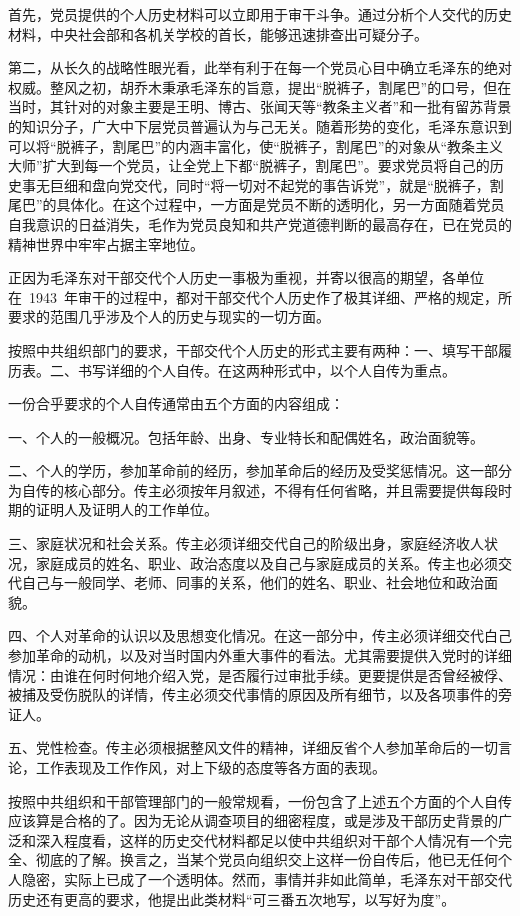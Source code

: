 首先，党员提供的个人历史材料可以立即用于审干斗争。通过分析个人交代的历史材料，中央社会部和各机关学校的首长，能够迅速排查出可疑分子。

第二，从长久的战略性眼光看，此举有利于在每一个党员心目中确立毛泽东的绝对权威。整风之初，胡乔木秉承毛泽东的旨意，提出“脱裤子，割尾巴”的口号，但在当时，其针对的对象主要是王明、博古、张闻天等“教条主义者”和一批有留苏背景的知识分子，广大中下层党员普遍认为与己无关。随着形势的变化，毛泽东意识到可以将“脱裤子，割尾巴”的内涵丰富化，使“脱裤子，割尾巴”的对象从“教条主义大师”扩大到每一个党员，让全党上下都“脱裤子，割尾巴”。要求党员将自己的历史事无巨细和盘向党交代，同时“将一切对不起党的事告诉党”，就是“脱裤子，割尾巴”的具体化。在这个过程中，一方面是党员不断的透明化，另一方面随着党员自我意识的日益消失，毛作为党员良知和共产党道德判断的最高存在，已在党员的精神世界中牢牢占据主宰地位。

正因为毛泽东对干部交代个人历史一事极为重视，并寄以很高的期望，各单位在~1943~年审干的过程中，都对干部交代个人历史作了极其详细、严格的规定，所要求的范围几乎涉及个人的历史与现实的一切方面。

按照中共组织部门的要求，干部交代个人历史的形式主要有两种：一、填写干部履历表。二、书写详细的个人自传。在这两种形式中，以个人自传为重点。

一份合乎要求的个人自传通常由五个方面的内容组成：

一、个人的一般概况。包括年龄、出身、专业特长和配偶姓名，政治面貌等。

二、个人的学历，参加革命前的经历，参加革命后的经历及受奖惩情况。这一部分为自传的核心部分。传主必须按年月叙述，不得有任何省略，并且需要提供每段时期的证明人及证明人的工作单位。

三、家庭状况和社会关系。传主必须详细交代自己的阶级出身，家庭经济收人状况，家庭成员的姓名、职业、政治态度以及自己与家庭成员的关系。传主也必须交代自己与一般同学、老师、同事的关系，他们的姓名、职业、社会地位和政治面貌。

四、个人对革命的认识以及思想变化情况。在这一部分中，传主必须详细交代白己参加革命的动机，以及对当时国内外重大事件的看法。尤其需要提供入党时的详细情况：由谁在何时何地介绍入党，是否履行过审批手续。更要提供是否曾经被俘、被捕及受伤脱队的详情，传主必须交代事情的原因及所有细节，以及各项事件的旁证人。

五、党性检查。传主必须根据整风文件的精神，详细反省个人参加革命后的一切言论，工作表现及工作作风，对上下级的态度等各方面的表现。

按照中共组织和干部管理部门的一般常规看，一份包含了上述五个方面的个人自传应该算是合格的了。因为无论从调查项目的细密程度，或是涉及干部历史背景的广泛和深入程度看，这样的历史交代材料都足以使中共组织对干部个人情况有一个完全、彻底的了解。换言之，当某个党员向组织交上这样一份自传后，他已无任何个人隐密，实际上已成了一个透明体。然而，事情并非如此简单，毛泽东对干部交代历史还有更高的要求，他提出此类材料“可三番五次地写，以写好为度”。

